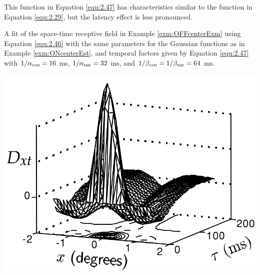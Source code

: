 \begin{rem}
   This function in Equation \ref{equ:2.47} has characteristics similar to the function in Equation \ref{equ:2.29}, but the latency effect is less pronounced.
\end{rem}

\begin{exm}
  \label{exm:OFFcenterEst}
   A fit of the space-time receptive field in Example \ref{exm:OFFcenterExm} using Equation \ref{equ:2.46} with the same parameters for the Gaussian functions as in Example \ref{exm:ONcenterEst}, and temporal factors given by Equation \ref{equ:2.47} with $1/\alpha_{\rm{cen}} = 16$ ms, $1/\alpha_{\rm{sur}} = 32$ ms, and $1/\beta_{\rm{cen}} = 1/\beta_{\rm{sur}} = 64$ ms.
  \begin{center}
    \includegraphics[scale=0.25]{./png/OFFcenterEst}
  \end{center}
\end{exm}


